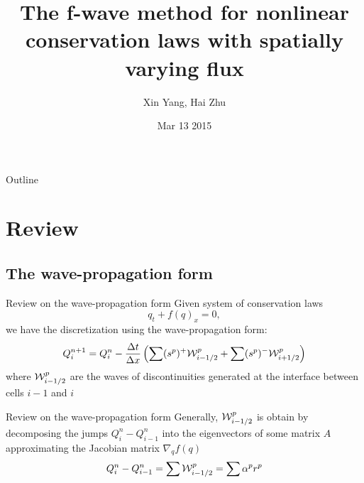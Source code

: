 \documentclass{beamer}
\title%
{The f-wave method for nonlinear conservation laws with spatially varying flux}
\author%
{Xin Yang, Hai Zhu}
\institute[University of Washington] %
{
  Group 01\\
  Course project for Amath 574\\
  Department of Applied Mathematics\\
  University of Washington
}
\date[03/13/2015] %
{Mar 13 2015}
\begin{document}
\begin{frame}
  \titlepage
\end{frame}

\begin{frame}{Outline}
  \tableofcontents
\end{frame}





\section{Review}
\subsection{The wave-propagation form}
\begin{frame}{Review on the wave-propagation form}
Given system of conservation laws
\[
q_t+f(q)_x=0,
\]
we have the discretization using the wave-propagation form:
\[
Q^{n+1}_i=Q^{n}_i-\frac{\Delta t}{\Delta x}\left(\sum (s^p)^+{\cal W}_{i-1/2}^p+\sum (s^p)^-{\cal W}_{i+1/2}^p\right)
\]
where ${\cal W}^p_{i-1/2}$ are the waves of discontinuities generated at the interface between cells $i-1$ and $i$
\end{frame}
\begin{frame}{Review on the wave-propagation form}
Generally, ${\cal W}^p_{i-1/2}$ is obtain by decomposing the jumps $Q_i^n-Q_{i-1}^n$ into the eigenvectors of some matrix $A$ approximating the Jacobian matrix $ \nabla_q f(q) $
\[
Q_i^n-Q_{i-1}^n=\sum {\cal W}^p_{i-1/2}=\sum \alpha^p r^p
\]
\end{frame}
\end{document}
